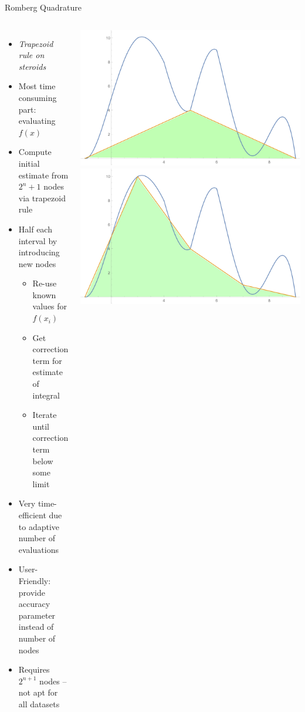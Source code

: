 
\begin{frame}{Romberg Quadrature}
%
\begin{columns}
\begin{itemize}
\item \emph{Trapezoid rule on steroids}
\item Most time consuming part: evaluating $f(x)$
\item Compute initial estimate from $2^n + 1$ nodes via trapezoid rule
\item Half each interval by introducing new nodes
	\begin{itemize}
	\item Re-use known values for $f(x_i)$
	\item Get correction term for estimate of integral
	\item Iterate until correction term below some limit
	\end{itemize}
\item Very time-efficient due to adaptive number of evaluations
\item User-Friendly: provide accuracy parameter instead of number of nodes
\item Requires $2^{n+1}$ nodes -- not apt for all datasets
\end{itemize}
%
\includegraphics[width=\linewidth]{./gfx/03-romberg-01}
\includegraphics[width=\linewidth]{./gfx/03-romberg-02}

\end{columns}
\end{frame}

